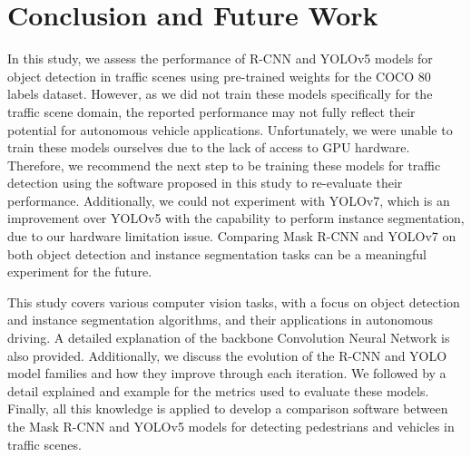 \chapter{Conclusion and Future Work} \label{chap:conclusion}

In this study, we assess the performance of R-CNN and YOLOv5 models for object detection in traffic scenes using pre-trained weights for the COCO 80 labels dataset. However, as we did not train these models specifically for the traffic scene domain, the reported performance may not fully reflect their potential for autonomous vehicle applications. Unfortunately, we were unable to train these models ourselves due to the lack of access to GPU hardware. Therefore, we recommend the next step to be training these models for traffic detection using the software proposed in this study to re-evaluate their performance. Additionally, we could not experiment with YOLOv7, which is an improvement over YOLOv5 with the capability to perform instance segmentation, due to our hardware limitation issue. Comparing Mask R-CNN and YOLOv7 on both object detection and instance segmentation tasks can be a meaningful experiment for the future.

This study covers various computer vision tasks, with a focus on object detection and instance segmentation algorithms, and their applications in autonomous driving. A detailed explanation of the backbone Convolution Neural Network is also provided. Additionally, we discuss the evolution of the R-CNN and YOLO model families and how they improve through each iteration. We followed by a detail explained and example for the metrics used to evaluate these models. Finally, all this knowledge is applied to develop a comparison software between the Mask R-CNN and YOLOv5 models for detecting pedestrians and vehicles in traffic scenes.